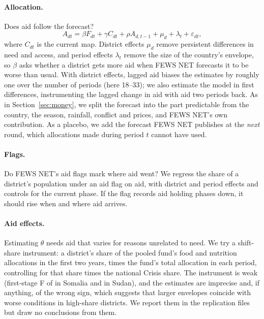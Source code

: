 \documentclass[11pt]{article}
\begin{document}
\begin{appendices}
\paragraph{Allocation.} Does aid follow the forecast?
\begin{equation*}
A_{dt} = \beta F_{dt} + \gamma C_{dt} + \rho A_{d,t-1} + \mu_d + \lambda_t + \varepsilon_{dt},
\end{equation*}
where $C_{dt}$ is the current map. District effects $\mu_d$ remove persistent differences in need and access, and period effects $\lambda_t$ remove the size of the country's envelope, so $\beta$ asks whether a district gets more aid when FEWS NET forecasts it to be worse than usual. With district effects, lagged aid biases the estimates by roughly one over the number of periods (here 18--33); we also estimate the model in first differences, instrumenting the lagged change in aid with aid two periods back. As in Section~\ref{sec:money}, we split the forecast into the part predictable from the country, the season, rainfall, conflict and prices, and FEWS NET's own contribution. As a placebo, we add the forecast FEWS NET publishes at the \emph{next} round, which allocations made during period $t$ cannot have used.

\paragraph{Flags.} Do FEWS NET's aid flags mark where aid went? We regress the share of a district's population under an aid flag on aid, with district and period effects and controls for the current phase. If the flag records aid holding phases down, it should rise when and where aid arrives.

\paragraph{Aid effects.} Estimating $\theta$ needs aid that varies for reasons unrelated to need. We try a shift-share instrument: a district's share of the pooled fund's food and nutrition allocations in the first two years, times the fund's total allocation in each period, controlling for that share times the national Crisis share. The instrument is weak (first-stage F of \subSoIvF{} in Somalia and \subSdIvF{} in Sudan), and the estimates are imprecise and, if anything, of the wrong sign, which suggests that larger envelopes coincide with worse conditions in high-share districts. We report them in the replication files but draw no conclusions from them.


\end{appendices}
\end{document}
